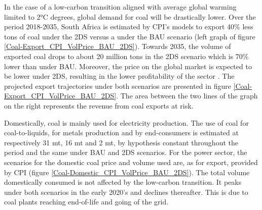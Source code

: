 \documentclass[12pt,english]{article}
\begin{document}
In the case of a low-carbon transition aligned with average global warming limited to 2°C degrees, global demand for coal will be drastically lower. Over the period 2018-2035, South Africa is estimated by CPI's models to export 40\% less tons of coal under the 2DS versus a under the BAU scenario (left graph of figure \ref{Coal-Export_CPI_VolPrice_BAU_2DS}). %
Towards 2035, the volume of exported coal drops to about 20 million tons in the 2DS scenario which is 70\% lower than under BAU. Moreover, the price on the global market is expected to be lower under 2DS, resulting in the lower profitability of the sector . %
The projected export trajectories under both scenarios are presented in figure \ref{Coal-Export_CPI_VolPrice_BAU_2DS}. The area between the two lines of the graph on the right represents the revenue from coal exports at risk.

Domestically, coal is mainly used for electricity production. %
The use of coal for coal-to-liquids, for metals production and by end-consumers is estimated at respectively 31 mt, 16 mt and 2 mt, by hypothesis constant throughout the period and the same under BAU and 2DS scenarios. For the power sector, the scenarios for the domestic coal price and volume used are, as for export, provided by CPI (figure \ref{Coal-Domestic_CPI_VolPrice_BAU_2DS}).  The total volume domestically consumed is not affected by the low-carbon transition. It peaks under both scenarios in the early 2020's and declines thereafter. This is due to coal plants reaching end-of-life and going of the grid. 
\end{document}
